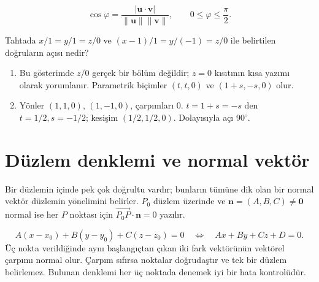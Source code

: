 {\small\[
\cos\varphi=\frac{|\mathbf u\cdot\mathbf v|}{\|\mathbf u\|\|\mathbf v\|},\qquad 0\le\varphi\le\frac\pi2.
\]}
\begin{tcolorbox}[title={Örnek 2.3 | Tahtadaki sıfır paydalı gösterim},colframe=accent]Tahtada \(x/1=y/1=z/0\) ve \((x-1)/1=y/(-1)=z/0\) ile belirtilen doğruların açısı nedir?
\par{}\end{tcolorbox}
\begin{tcolorbox}[title={Adım adım çözüm},colback=green!3!white,colframe=green]\begin{enumerate}
\item Bu gösterimde \(z/0\) gerçek bir bölüm değildir; \(z=0\) kısıtının kısa yazımı olarak yorumlanır. Parametrik biçimler \((t,t,0)\) ve \((1+s,-s,0)\) olur.
\item Yönler \((1,1,0)\), \((1,-1,0)\), çarpımları 0. \(t=1+s=-s\) den \(t=1/2,s=-1/2\); kesişim \((1/2,1/2,0)\). Dolayısıyla açı \(90^\circ\).
\end{enumerate}\end{tcolorbox}
\section{Düzlem denklemi ve normal vektör}
Bir düzlemin içinde pek çok doğrultu vardır; bunların tümüne dik olan bir normal vektör düzlemin yönelimini belirler. \(P_0\) düzlem üzerinde ve \(\mathbf n=(A,B,C)\ne\mathbf0\) normal ise her \(P\) noktası için \(\overrightarrow{P_0P}\cdot\mathbf n=0\) yazılır.


{\small\[
A(x-x_0)+B(y-y_0)+C(z-z_0)=0\quad\Longleftrightarrow\quad Ax+By+Cz+D=0.
\]}
Üç nokta verildiğinde aynı başlangıçtan çıkan iki fark vektörünün vektörel çarpımı normal olur. Çarpım sıfırsa noktalar doğrudaştır ve tek bir düzlem belirlemez. Bulunan denklemi her üç noktada denemek iyi bir hata kontrolüdür.

